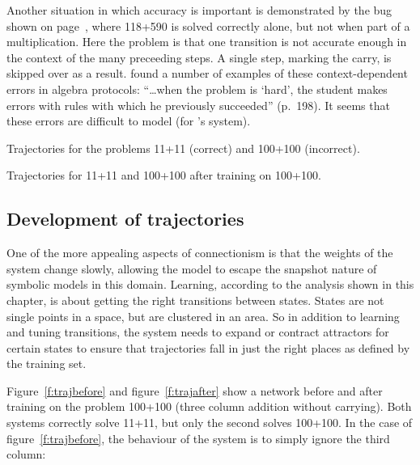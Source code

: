 Another situation in which accuracy is important is demonstrated by the
bug shown on page~\pageref{carryskip}, where 118+590 is solved correctly
alone, but not
when part of a multiplication. Here the problem is that one transition is
not accurate enough in the context of the many preceeding steps.  A single
step, marking the carry, is skipped over as a result.
 found a number of examples of these context-dependent
errors in algebra protocols: ``\ldots when the problem is `hard', the
student makes errors with rules with which he previously succeeded''
(p.~198).  It seems that these errors are difficult to model (for
\citeauthor{sleeasse}'s system).


\begin{fancyfigure}
\centerline{}
\caption{Trajectories for the problems 11+11 (correct) and 100+100
(incorrect).}
\label{f:trajbefore}
\end{fancyfigure}

\begin{fancyfigure}
\centerline{}
\caption{Trajectories for 11+11 and 100+100 after training on
100+100.}
\label{f:trajafter}
\end{fancyfigure}



\subsection{Development of trajectories}\label{s:devtraj}

One of the more appealing aspects of connectionism is that the
weights of the
system change slowly, allowing the model to escape the snapshot nature of
symbolic models in this domain.  Learning, according to the analysis shown
in this chapter, is about getting the right transitions between states.
States are not single points in a space, but are clustered in an area. So
in addition to learning and tuning transitions, the system needs to expand
or contract attractors for certain states to ensure that trajectories fall
in just the right places as defined by the training set.

Figure~\ref{f:trajbefore} and figure~\ref{f:trajafter} show a network
before and after training on the problem 100+100 (three column addition
without carrying).  Both systems correctly solve 11+11, but only the
second solves 100+100.  In the case of figure~\ref{f:trajbefore}, the
behaviour of the system is to simply ignore the third column:

